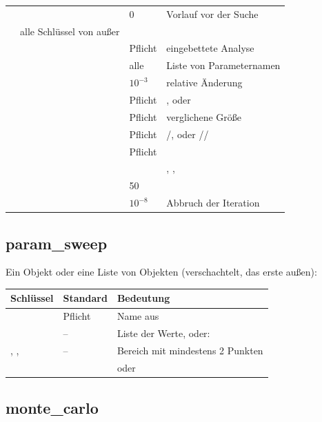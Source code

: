 \begin{longtable}{@{}P{1.8cm}P{3.6cm}P{3.4cm}P{5.0cm}@{}}
   &  & 0 & Vorlauf vor der Suche \\
   & alle Schlüssel von  außer  & & \\
  \addlinespace[0.8ex]
   &  & Pflicht & eingebettete Analyse \\
   &  & alle & Liste von Parameternamen \\
   &  & $10^{-3}$ & relative Änderung \\
  \addlinespace[0.8ex]
   &  & Pflicht & ,  oder  \\
   &  & Pflicht & verglichene Größe \\
   &  & Pflicht & /,  oder // \\
   &  & Pflicht &  \\
   &  &  & , ,  \\
   &  & 50 & \\
   &  & $10^{-8}$ & Abbruch der Iteration \\
\end{longtable}

\subsection*{param\_sweep}

Ein Objekt oder eine Liste von Objekten (verschachtelt, das erste außen):

\begin{longtable}{@{}P{3.0cm}P{3.4cm}P{7.4cm}@{}}
  \toprule
  Schlüssel & Standard & Bedeutung \\
  \midrule
  \endhead
  \bottomrule
  \endfoot
   & Pflicht & Name aus  \\
   & – & Liste der Werte, oder: \\
  , ,  & – & Bereich mit mindestens 2 Punkten \\
   &  & oder  \\
\end{longtable}

\subsection*{monte\_carlo}

